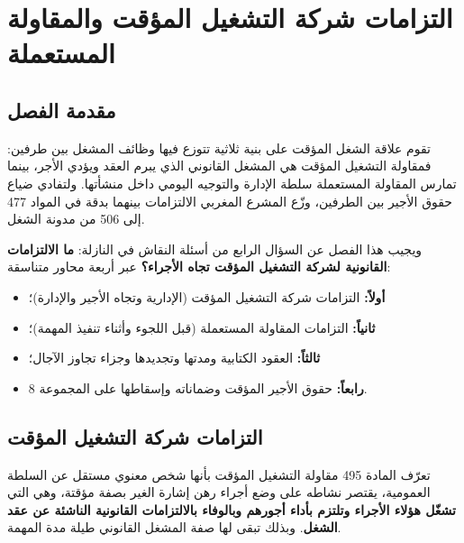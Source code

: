 
\chapter{التزامات شركة التشغيل المؤقت والمقاولة المستعملة}
\label{chap:chapitre4}

\section*{مقدمة الفصل}

تقوم علاقة الشغل المؤقت على بنية ثلاثية تتوزع فيها وظائف المشغل بين طرفين: فمقاولة التشغيل المؤقت هي المشغل القانوني الذي يبرم العقد ويؤدي الأجر، بينما تمارس المقاولة المستعملة سلطة الإدارة والتوجيه اليومي داخل منشأتها. ولتفادي ضياع حقوق الأجير بين الطرفين، وزّع المشرع المغربي الالتزامات بينهما بدقة في المواد \textenglish{477} إلى \textenglish{506} من مدونة الشغل.

ويجيب هذا الفصل عن السؤال الرابع من أسئلة النقاش في النازلة: \textbf{ما الالتزامات القانونية لشركة التشغيل المؤقت تجاه الأجراء؟} عبر أربعة محاور متناسقة:
\begin{itemize}[leftmargin=*, itemsep=4pt]
    \item \textbf{أولاً:} التزامات شركة التشغيل المؤقت (الإدارية وتجاه الأجير والإدارة)؛
    \item \textbf{ثانياً:} التزامات المقاولة المستعملة (قبل اللجوء وأثناء تنفيذ المهمة)؛
    \item \textbf{ثالثاً:} العقود الكتابية ومدتها وتجديدها وجزاء تجاوز الآجال؛
    \item \textbf{رابعاً:} حقوق الأجير المؤقت وضماناته وإسقاطها على المجموعة \textenglish{8}.
\end{itemize}

\section{التزامات شركة التشغيل المؤقت}

تعرّف المادة \textenglish{495} مقاولة التشغيل المؤقت بأنها شخص معنوي مستقل عن السلطة العمومية، يقتصر نشاطه على وضع أجراء رهن إشارة الغير بصفة مؤقتة، وهي التي \textbf{تشغّل هؤلاء الأجراء وتلتزم بأداء أجورهم وبالوفاء بالالتزامات القانونية الناشئة عن عقد الشغل}. وبذلك تبقى لها صفة المشغل القانوني طيلة مدة المهمة.

